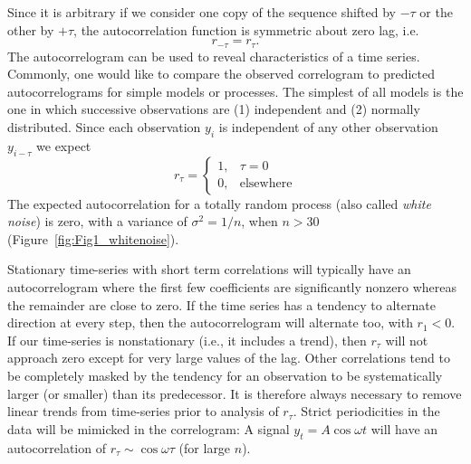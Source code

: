      Since it is arbitrary if we consider one copy of the sequence shifted by $-\tau$ or the other by $+\tau$, 
the autocorrelation function is symmetric about zero lag, i.e.
\begin{equation}
r_{-\tau} = r_\tau.
\end{equation}
The autocorrelogram can be used to reveal characteristics of a time series.  Commonly, one would 
like to compare the observed correlogram to predicted autocorrelograms for simple models or 
processes.  The simplest of all models is the one in which successive observations are (1) 
independent and (2) normally distributed.  Since each observation $y_i$ is independent of any other 
observation $y_{i-\tau}$ we expect 
\begin{equation}
r_\tau = \left \{ \begin{array}{cc}
1, & \tau = 0\\
0, & \mbox{elsewhere}
\end{array} \right . 
\end{equation}
\noindent
The expected autocorrelation for a totally random process (also called 
\emph{white noise}) is zero, with a variance of $\sigma^2 = 1/n$, when $n > 30$ (Figure~\ref{fig:Fig1_whitenoise}).

	Stationary time-series with short term correlations will typically have an autocorrelogram where the first few 
coefficients are significantly nonzero whereas the remainder are close to zero.  If the time series 
has a tendency to alternate direction at every step, then the autocorrelogram will alternate too, with $r_1 < 0$.  If our time-series
is nonstationary (i.e., it includes a trend), then $r_\tau$ will not approach zero except for very 
large values of the lag.  Other correlations tend to be completely masked by the tendency for an 
observation to be systematically larger (or smaller) than its predecessor.  It is therefore always 
necessary to remove linear trends from time-series prior to analysis of $r_\tau$.  Strict periodicities in 
the data will be mimicked in the correlogram: A signal $y_t = A \cos \omega t$ will have an autocorrelation 
of $r_\tau \sim \cos \omega \tau$ (for large $n$).
	
